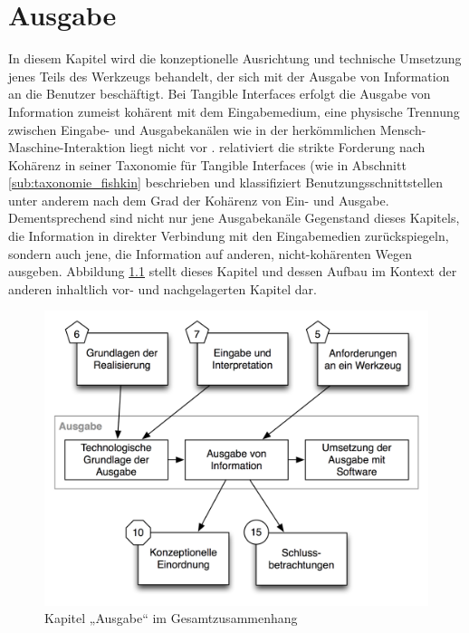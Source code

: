 
\chapter{Ausgabe} %
\label{cha:visualisierung}

In diesem Kapitel wird die konzeptionelle Ausrichtung und technische Umsetzung jenes Teils des Werkzeugs behandelt, der sich mit der Ausgabe von Information an die Benutzer beschäftigt. Bei Tangible Interfaces erfolgt die Ausgabe von Information zumeist kohärent mit dem Eingabemedium, eine physische Trennung zwischen Eingabe- und Ausgabekanälen wie in der herkömmlichen Mensch-Maschine-Interaktion liegt nicht vor \citep{Ullmer00}. \citet{Fishkin04} relativiert die strikte Forderung nach Kohärenz in seiner Taxonomie für Tangible Interfaces (wie in Abschnitt \ref{sub:taxonomie_fishkin} beschrieben und klassifiziert Benutzungsschnittstellen unter anderem nach dem Grad der Kohärenz von Ein- und Ausgabe. Dementsprechend sind nicht nur jene Ausgabekanäle Gegenstand dieses Kapitels, die Information in direkter Verbindung mit den Eingabemedien zurückspiegeln, sondern auch jene, die Information auf anderen, nicht-kohärenten Wegen ausgeben. Abbildung \ref{fig:img_Kontextgrafiken_k8} stellt dieses Kapitel und dessen Aufbau im Kontext der anderen inhaltlich vor- und nachgelagerten Kapitel dar.

\begin{figure}[htbp]
	\centering
		\includegraphics[scale=0.75]{img/Kontextgrafiken/k8.png}
	\caption{Kapitel „Ausgabe“ im Gesamtzusammenhang}
	\label{fig:img_Kontextgrafiken_k8}
\end{figure}

